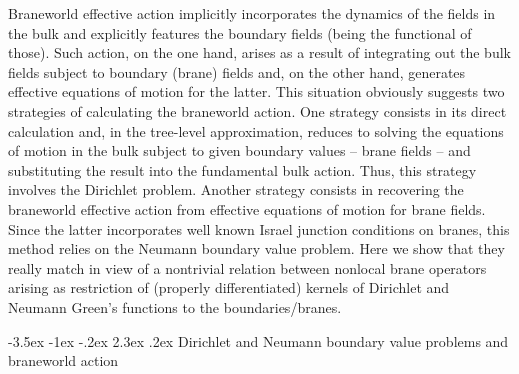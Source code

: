 \documentclass[a4paper,12pt]{article}
\makeatletter
\renewcommand\section{\@startsection {section}{1}{\z@}%
                                   {-3.5ex \@plus -1ex \@minus -.2ex}%
                                   {2.3ex \@plus.2ex}%
                                   {\normalfont\large\bfseries}}
\providecommand{\M}{{\cal M}}
\providecommand{\dM}{{\partial \cal M}}
\makeatother
\begin{document}
Braneworld effective action implicitly incorporates the dynamics
of the fields in the bulk and explicitly features the boundary
fields (being the functional of those). Such action, on the one
hand, arises as a result of integrating out the bulk fields
subject to boundary (brane) fields and, on the other hand,
generates effective equations of motion for the latter. This
situation obviously suggests two strategies of calculating the
braneworld action. One strategy consists in its direct calculation
and, in the tree-level approximation, reduces to solving the
equations of motion in the bulk subject to given boundary values
-- brane fields -- and substituting the result into the
fundamental bulk action. Thus, this strategy involves the
Dirichlet problem. Another strategy consists in recovering the
braneworld effective action from effective equations of motion for
brane fields. Since the latter incorporates well known Israel
junction conditions on branes, this method relies on
the Neumann boundary value problem. Here we show that they really
match in view of a nontrivial relation between nonlocal brane
operators arising as restriction of (properly differentiated)
kernels of Dirichlet and Neumann Green's functions to the
boundaries/branes.

\section{Dirichlet and Neumann
boundary value problems and braneworld action}
\renewcommand{\M}{\mathbf B}
\renewcommand{\dM}{\mathbf b}
\providecommand{\U}{\mathbf U}
\end{document}
